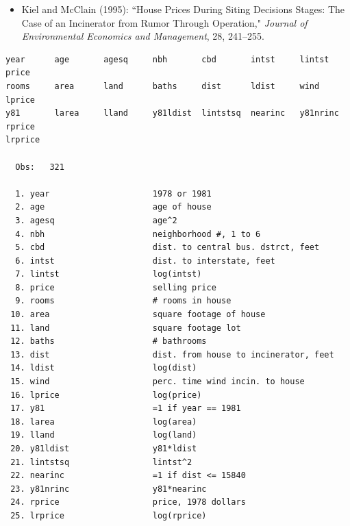 \documentclass[landscape,letterpaper,9pt]{article}
\begin{document}
\begin{itemize}
\item
Kiel and McClain (1995): ``House Prices  During  Siting  Decisions Stages: The Case of an Incinerator
from Rumor Through Operation," \emph{Journal of Environmental Economics and Management}, 28, 241--255.
\end{itemize}
\begin{Verbatim}
year      age       agesq     nbh       cbd       intst     lintst    price
rooms     area      land      baths     dist      ldist     wind      lprice
y81       larea     lland     y81ldist  lintstsq  nearinc   y81nrinc  rprice
lrprice

  Obs:   321

  1. year                     1978 or 1981
  2. age                      age of house
  3. agesq                    age^2
  4. nbh                      neighborhood #, 1 to 6
  5. cbd                      dist. to central bus. dstrct, feet
  6. intst                    dist. to interstate, feet
  7. lintst                   log(intst)
  8. price                    selling price
  9. rooms                    # rooms in house
 10. area                     square footage of house
 11. land                     square footage lot
 12. baths                    # bathrooms
 13. dist                     dist. from house to incinerator, feet
 14. ldist                    log(dist)
 15. wind                     perc. time wind incin. to house
 16. lprice                   log(price)
 17. y81                      =1 if year == 1981
 18. larea                    log(area)
 19. lland                    log(land)
 20. y81ldist                 y81*ldist
 21. lintstsq                 lintst^2
 22. nearinc                  =1 if dist <= 15840
 23. y81nrinc                 y81*nearinc
 24. rprice                   price, 1978 dollars
 25. lrprice                  log(rprice)
\end{Verbatim}
\newpage
\end{document}
